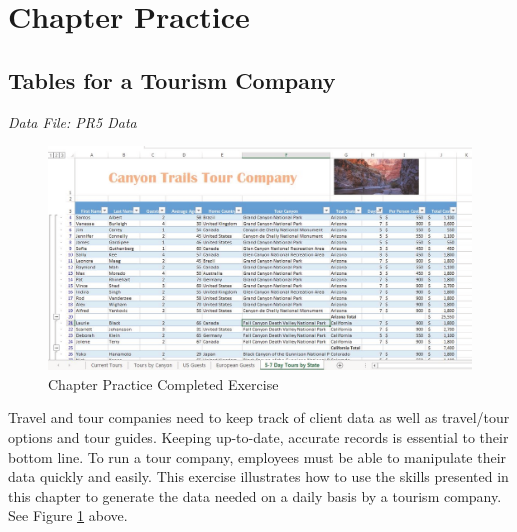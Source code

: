 \section{Chapter Practice}

\subsection{Tables for a Tourism Company}

\textit{Data File: PR5 Data}

\begin{figure}[H]
	\centering
	\includegraphics[width=\maxwidth{.95\linewidth}]{gfx/ch05_fig30}
	\caption{Chapter Practice Completed Exercise}
	\label{05:fig30}
\end{figure}

Travel and tour companies need to keep track of client data as well as travel/tour options and tour guides. Keeping up-to-date, accurate records is essential to their bottom line. To run a tour company, employees must be able to manipulate their data quickly and easily. This exercise illustrates how to use the skills presented in this chapter to generate the data needed on a daily basis by a tourism company. See Figure \ref{05:fig30} above.

